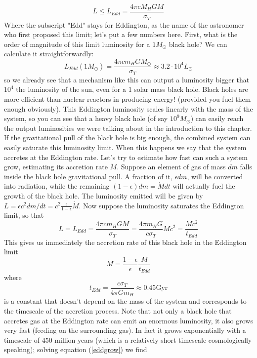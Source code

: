 \documentclass[11pt, a4paper,oneside,openright]{book}
\numberwithin{equation}{section}
\begin{document}
\begin{equation}
L\leq L_{Edd} = \frac{4\pi c M_H G M}{\sigma_T}
\end{equation}
Where the subscript "Edd" stays for Eddington, as the name of the astronomer who first proposed this limit; let's put a few numbers here. First, what is the order of magnitude of this limit luminosity for a $1M_\odot$ black hole? We can calculate it straightforwardly:
\begin{equation}
L_{Edd}(1M_\odot)=\frac{4\pi c m_H G M_\odot}{\sigma_T}\approx 3.2\cdot 10^4 L_\odot
\end{equation} 
so we already see that a mechanism like this can output a luminosity bigger that $10^4$ the luminosity of the sun, even for a 1 solar mass black hole. Black holes are more efficient than nuclear reactors in producing energy! (provided you fuel them enough obviously). This Eddington luminosity scales linearly with the mass of the system, so you can see that a heavy black hole (of say $10^9M_\odot$) can easily reach the output luminosities we were talking about in the introduction to this chapter. If the gravitational pull of the black hole is big enough, the combined system can easily saturate this luminosity limit. When this happens we say that the system accretes at the Eddington rate. Let's try to estimate how fast can such a system grow, estimating its accretion rate $\dot{M}$. Suppose an element of gas of mass $dm$ falls inside the black hole gravitational pull. A fraction of it, $\epsilon dm$, will be converted into radiation, while the remaining $(1-\epsilon)dm = \dot{M}dt$ will actually fuel the growth of the black hole. The luminosity emitted will be given by $L = \epsilon c^2dm/dt = c^2\frac{\epsilon}{1-\epsilon}\dot{M}$. Now suppose the luminosity saturates the Eddington limit, so that
\begin{equation}
L = L_{Edd} = \frac{4\pi c m_H G M}{\sigma_T} = \frac{4\pi m_H G}{c\sigma_T}Mc^2 = \frac{Mc^2}{t_{Edd}} 
\end{equation}
This gives us immediately the accretion rate of this black hole in the Eddington limit
\begin{equation}
\dot{M}=\frac{1-\epsilon}{\epsilon}\frac{M}{t_{Edd}}
\end{equation}
where
\begin{equation}
\label{eddgrow}
t_{Edd} = \frac{c\sigma_T}{4\pi G m_H}\approx 0.45 \mathrm{Gyr}
\end{equation}
is a constant that doesn't depend on the mass of the system and corresponds to the timescale of the accretion process. Note that not only a black hole that accretes gas at the Eddington rate can emit an enormous luminosity, it also grows very fast (feeding on the surrounding gas). In fact it grows exponentially with a timescale of 450 million years (which is a relatively short timescale cosmologically speaking); solving equation (\ref{eddgrow}) we find
\end{document}
